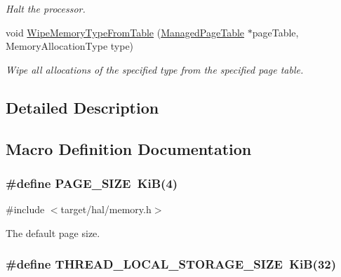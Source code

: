 \begin{DoxyCompactItemize}
\begin{DoxyCompactList}\small\item\em Halt the processor. \end{DoxyCompactList}\item 
void \hyperlink{group__memory__hal_gaeacbe2fb33e6a0df47defab0a6643fef}{Wipe\+Memory\+Type\+From\+Table} (\hyperlink{structManagedPageTable}{Managed\+Page\+Table} $\ast$page\+Table, Memory\+Allocation\+Type type)
\begin{DoxyCompactList}\small\item\em Wipe all allocations of the specified type from the specified page table. \end{DoxyCompactList}\end{DoxyCompactItemize}


\subsection{Detailed Description}


\subsection{Macro Definition Documentation}
\subsubsection[{\texorpdfstring{P\+A\+G\+E\+\_\+\+S\+I\+ZE}{PAGE\_SIZE}}]{\setlength{\rightskip}{0pt plus 5cm}\#define P\+A\+G\+E\+\_\+\+S\+I\+ZE~KiB(4)}\hypertarget{group__memory__hal_ga7d467c1d283fdfa1f2081ba1e0d01b6e}{}\label{group__memory__hal_ga7d467c1d283fdfa1f2081ba1e0d01b6e}


{\ttfamily \#include $<$target/hal/memory.\+h$>$}

The default page size. 
\subsubsection[{\texorpdfstring{T\+H\+R\+E\+A\+D\+\_\+\+L\+O\+C\+A\+L\+\_\+\+S\+T\+O\+R\+A\+G\+E\+\_\+\+S\+I\+ZE}{THREAD\_LOCAL\_STORAGE\_SIZE}}]{\setlength{\rightskip}{0pt plus 5cm}\#define T\+H\+R\+E\+A\+D\+\_\+\+L\+O\+C\+A\+L\+\_\+\+S\+T\+O\+R\+A\+G\+E\+\_\+\+S\+I\+ZE~KiB(32)}\hypertarget{group__memory__hal_ga19026599ca53eb83da5f02be3604f4fc}{}\label{group__memory__hal_ga19026599ca53eb83da5f02be3604f4fc}


